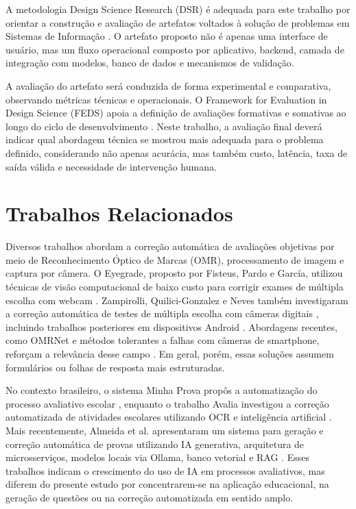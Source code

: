 A metodologia Design Science Research (DSR) é adequada para este trabalho por orientar a construção e avaliação de artefatos voltados à solução de problemas em Sistemas de Informação \cite{sposito2024design}. O artefato proposto não é apenas uma interface de usuário, mas um fluxo operacional composto por aplicativo, backend, camada de integração com modelos, banco de dados e mecanismos de validação.

A avaliação do artefato será conduzida de forma experimental e comparativa, observando métricas técnicas e operacionais. O Framework for Evaluation in Design Science (FEDS) apoia a definição de avaliações formativas e somativas ao longo do ciclo de desenvolvimento \cite{feds_framework2026}. Neste trabalho, a avaliação final deverá indicar qual abordagem técnica se mostrou mais adequada para o problema definido, considerando não apenas acurácia, mas também custo, latência, taxa de saída válida e necessidade de intervenção humana.

\section{Trabalhos Relacionados}

Diversos trabalhos abordam a correção automática de avaliações objetivas por meio de Reconhecimento Óptico de Marcas (OMR), processamento de imagem e captura por câmera. O Eyegrade, proposto por Fisteus, Pardo e García, utilizou técnicas de visão computacional de baixo custo para corrigir exames de múltipla escolha com webcam \cite{fisteus2013eyegrade}. Zampirolli, Quilici-Gonzalez e Neves também investigaram a correção automática de testes de múltipla escolha com câmeras digitais \cite{zampirolli2013automatic}, incluindo trabalhos posteriores em dispositivos Android \cite{zampirolli2015android}. Abordagens recentes, como OMRNet e métodos tolerantes a falhas com câmeras de smartphone, reforçam a relevância desse campo \cite{mondal2023omrnet,hafeez2024omrsmartphone}. Em geral, porém, essas soluções assumem formulários ou folhas de resposta mais estruturadas.

No contexto brasileiro, o sistema Minha Prova propôs a automatização do processo avaliativo escolar \cite{silva2019minhaprova}, enquanto o trabalho Avalia investigou a correção automatizada de atividades escolares utilizando OCR e inteligência artificial \cite{oliveira2024avalia}. Mais recentemente, Almeida et al. apresentaram um sistema para geração e correção automática de provas utilizando IA generativa, arquitetura de microsserviços, modelos locais via Ollama, banco vetorial e RAG \cite{almeida2025geracao}. Esses trabalhos indicam o crescimento do uso de IA em processos avaliativos, mas diferem do presente estudo por concentrarem-se na aplicação educacional, na geração de questões ou na correção automatizada em sentido amplo.

